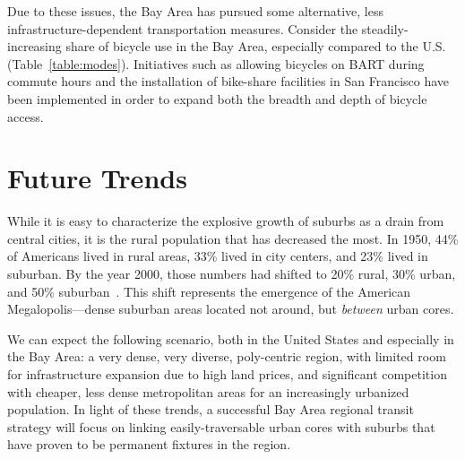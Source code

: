 \documentclass[12pt]{article}
\begin{document}
Due to these issues, the Bay Area has pursued some alternative, less infrastructure-dependent transportation measures. Consider the steadily-increasing share of bicycle use in the Bay Area, especially compared to the U.S. (Table~\ref{table:modes}). Initiatives such as allowing bicycles on BART during commute hours and the installation of bike-share facilities in San Francisco have been implemented in order to expand both the breadth and depth of bicycle access. 

\section{Future Trends}

While it is easy to characterize the explosive growth of suburbs as a drain from central cities, it is the rural population that has decreased the most. In 1950, 44\% of Americans lived in rural areas, 33\% lived in city centers, and 23\% lived in suburban. By the year 2000, those numbers had shifted to 20\% rural, 30\% urban, and 50\% suburban~\citep{pisarski2006commuting}. This shift represents the emergence of the American Megalopolis---dense suburban areas located not around, but \emph{between} urban cores.

We can expect the following scenario, both in the United States and especially in the Bay Area: a very dense, very diverse, poly-centric region, with limited room for infrastructure expansion due to high land prices, and significant competition with cheaper, less dense metropolitan areas for an increasingly urbanized population. In light of these trends, a successful Bay Area regional transit strategy will focus on linking easily-traversable urban cores with suburbs that have proven to be permanent fixtures in the region.




\end{document}
